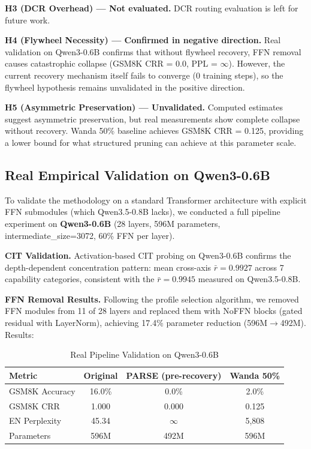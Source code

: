 \documentclass[twocolumn]{article}
\begin{document}
\textbf{H3 (DCR Overhead) --- Not evaluated.}
DCR routing evaluation is left for future work.

\textbf{H4 (Flywheel Necessity) --- Confirmed in negative direction.}
Real validation on Qwen3-0.6B confirms that without flywheel recovery, FFN removal causes catastrophic collapse (GSM8K CRR = 0.0, PPL = $\infty$). However, the current recovery mechanism itself fails to converge (0 training steps), so the flywheel hypothesis remains unvalidated in the positive direction.

\textbf{H5 (Asymmetric Preservation) --- Unvalidated.}
Computed estimates suggest asymmetric preservation, but real measurements show complete collapse without recovery. Wanda 50\% baseline achieves GSM8K CRR = 0.125, providing a lower bound for what structured pruning can achieve at this parameter scale.

\subsection{Real Empirical Validation on Qwen3-0.6B}

To validate the methodology on a standard Transformer architecture with explicit FFN submodules (which Qwen3.5-0.8B lacks), we conducted a full pipeline experiment on \textbf{Qwen3-0.6B} (28 layers, 596M parameters, intermediate\_size=3072, 60\% FFN per layer).

\textbf{CIT Validation.} Activation-based CIT probing on Qwen3-0.6B confirms the depth-dependent concentration pattern: mean cross-axis $\bar{r} = 0.9927$ across 7 capability categories, consistent with the $\bar{r} = 0.9945$ measured on Qwen3.5-0.8B.

\textbf{FFN Removal Results.} Following the profile selection algorithm, we removed FFN modules from 11 of 28 layers and replaced them with NoFFN blocks (gated residual with LayerNorm), achieving 17.4\% parameter reduction (596M$\to$492M). Results:

\begin{table}[h]
\centering
\caption{Real Pipeline Validation on Qwen3-0.6B}
\label{tab:real_validation}
\begin{tabular}{lccc}
\toprule
Metric & Original & PARSE (pre-recovery) & Wanda 50\% \\
\midrule
GSM8K Accuracy & 16.0\% & 0.0\% & 2.0\% \\
GSM8K CRR & 1.000 & 0.000 & 0.125 \\
EN Perplexity & 45.34 & $\infty$ & 5,808 \\
Parameters & 596M & 492M & 596M \\
\bottomrule
\end{tabular}
\end{table}
\end{document}
